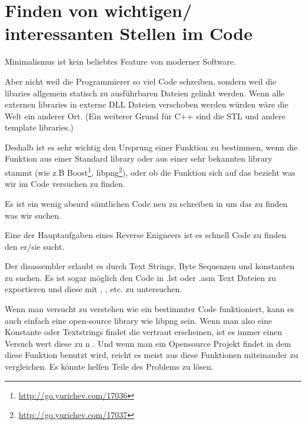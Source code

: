 \chapter{Finden von wichtigen/ interessanten Stellen im Code}

Minimalismus ist kein beliebtes Feature von moderner Software.


Aber nicht weil die Programmierer so viel Code schreiben, sondern weil die libaries allgemein statisch zu ausf\"uhrbaren
Dateien gelinkt werden. 
Wenn alle externen libraries in externe DLL Dateien verschoben werden w\"urden w\"are die Welt ein anderer Ort.
(Ein weiterer Grund f\"ur C++ sind die \ac{STL} und andere template libraries.)

\newcommand{\FOOTNOTEBOOST}{\footnote{\url{http://go.yurichev.com/17036}}}
\newcommand{\FOOTNOTELIBPNG}{\footnote{\url{http://go.yurichev.com/17037}}}

Deshalb ist es sehr wichtig den Ursprung einer Funktion zu bestimmen, wenn die Funktion aus 
einer Standard library oder aus einer sehr bekannten library stammt (wie z.B Boost\FOOTNOTEBOOST, libpng\FOOTNOTELIBPNG),
oder ob die Funktion sich auf das bezieht was wir im Code versuchen zu finden.

Es ist ein wenig absurd s\"amtlichen Code neu zu schreiben in \CCpp um das zu finden 
was wir suchen.

Eine der Hauptaufgaben eines Reverse Enigneers ist es schnell Code zu finden den er/sie sucht.

\myindex{\GrepUsage}

Der \IDA disassembler erlaubt es durch Text Strings, Byte Sequenzen und konstanten zu suchen. 
Es ist sogar m\"oglich den Code in .lst oder .asm Text Dateien zu exportieren und diese mit , , etc. zu untersuchen.

Wenn man versucht zu verstehen wie ein bestimmter Code funktioniert, kann es auch einfach eine open-source library wie libpng sein. %
Wenn man also eine Konstante oder Textstrings findet die vertraut erscheinen, ist es immer einen Versuch wert diese zu n .
Und wenn man ein Opensource Projekt findet in dem diese Funktion benutzt wird, 
reicht es meist aus diese Funktionen miteinander zu vergleichen.
Es k\"onnte helfen Teile des Problems zu l\"osen.


